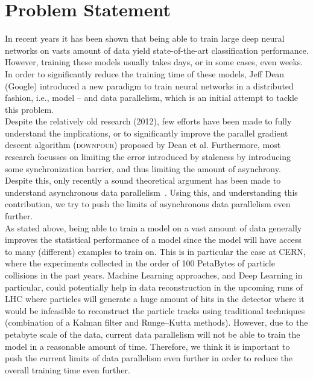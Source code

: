 \section{Problem Statement}
\label{sec:problem_statement}

In recent years it has been shown that being able to train large deep neural networks on vasts amount of data yield state-of-the-art classification performance. However, training these models usually takes days, or in some cases, even weeks. In order to significantly reduce the training time of these models, Jeff Dean (Google) introduced a new paradigm to train neural networks in a distributed fashion, i.e., model – and data parallelism, which is an initial attempt to tackle this problem.\\

Despite the relatively old research (2012), few efforts have been made to fully understand the implications, or to significantly improve the parallel gradient descent algorithm (\textsc{downpour}) proposed by Dean et al. Furthermore, most research focusses on limiting the error introduced by staleness by introducing some synchronization barrier, and thus limiting the amount of asynchrony. Despite this, only recently a sound theoretical argument has been made to understand asynchronous data parallelism~\cite{implicitmomentum}. Using this, and understanding this contribution, we try to push the limits of asynchronous data parallelism even further.\\

As stated above, being able to train a model on a vast amount of data generally improves the statistical performance of a model since the model will have access to many (different) examples to train on. This is in particular the case at CERN, where the experiments collected in the order of 100 PetaBytes of particle collisions in the past years. Machine Learning approaches, and Deep Learning in particular, could potentially help in data reconstruction in the upcoming runs of LHC where particles will generate a huge amount of hits in the detector where it would be infeasible to reconstruct the particle tracks using traditional techniques (combination of a Kalman filter and Runge–Kutta methods). However, due to the petabyte scale of the data, current data parallelism will not be able to train the model in a reasonable amount of time. Therefore, we think it is important to push the current limits of data parallelism even further in order to reduce the overall training time even further.

